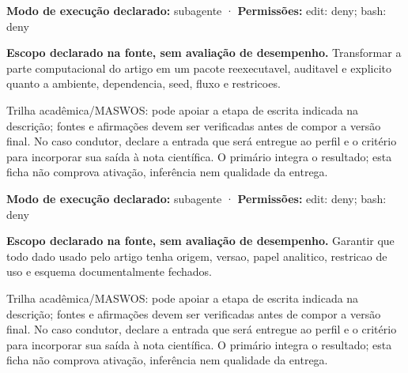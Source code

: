 \begin{arquitetura}
\textbf{Modo de execução declarado:} subagente · \textbf{Permissões:} edit: deny; bash: deny
\end{arquitetura}


\begin{descricao}
\textbf{Escopo declarado na fonte, sem avaliação de desempenho.}
Transformar a parte computacional do artigo em um pacote reexecutavel, auditavel e explicito quanto a ambiente, dependencia, seed, fluxo e restricoes.
\end{descricao}

\begin{funcao}
Trilha acadêmica/MASWOS: pode apoiar a etapa de escrita indicada na descrição; fontes e afirmações devem ser verificadas antes de compor a versão final. No caso condutor, declare a entrada que será entregue ao perfil e o critério para incorporar sua saída à nota científica. O primário integra o resultado; esta ficha não comprova ativação, inferência nem qualidade da entrega.
\end{funcao}

\begin{arquitetura}
\textbf{Modo de execução declarado:} subagente · \textbf{Permissões:} edit: deny; bash: deny
\end{arquitetura}


\begin{descricao}
\textbf{Escopo declarado na fonte, sem avaliação de desempenho.}
Garantir que todo dado usado pelo artigo tenha origem, versao, papel analitico, restricao de uso e esquema documentalmente fechados.
\end{descricao}

\begin{funcao}
Trilha acadêmica/MASWOS: pode apoiar a etapa de escrita indicada na descrição; fontes e afirmações devem ser verificadas antes de compor a versão final. No caso condutor, declare a entrada que será entregue ao perfil e o critério para incorporar sua saída à nota científica. O primário integra o resultado; esta ficha não comprova ativação, inferência nem qualidade da entrega.
\end{funcao}


